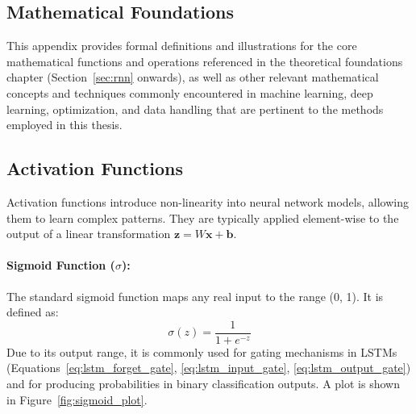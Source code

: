 \begin{appendices}
  \section{Mathematical Foundations}
  \label{app:math_foundations}

  This appendix provides formal definitions and illustrations for the core mathematical functions and operations referenced in the theoretical foundations chapter (Section~\ref{sec:rnn} onwards), as well as other relevant mathematical concepts and techniques commonly encountered in machine learning, deep learning, optimization, and data handling that are pertinent to the methods employed in this thesis. %


  \subsection{Activation Functions}
  Activation functions introduce non-linearity into neural network models, allowing them to learn complex patterns. They are typically applied element-wise to the output of a linear transformation \( \bm{z} = W\bm{x} + \bm{b} \).

  \paragraph{Sigmoid Function (\( \sigma \)):}
  The standard sigmoid function maps any real input to the range (0, 1). It is defined as:
  \begin{equation}
    \sigma(z) = \frac{1}{1 + e^{-z}}
  \end{equation}
  Due to its output range, it is commonly used for gating mechanisms in LSTMs (Equations~\ref{eq:lstm_forget_gate}, \ref{eq:lstm_input_gate}, \ref{eq:lstm_output_gate}) and for producing probabilities in binary classification outputs. A plot is shown in Figure~\ref{fig:sigmoid_plot}.


\end{appendices}
